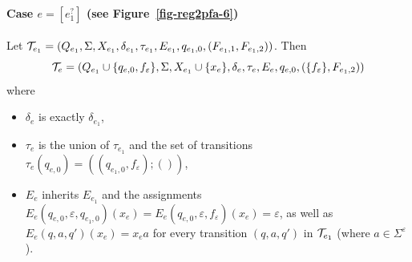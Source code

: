\paragraph{Case $e = [e_1^?]$ (see Figure~\ref{fig-reg2pfa-6})} Let $\mathcal{T}_{e_1} = (Q_{e_1}, \Sigma, X_{e_1}, \delta_{e_1}, \tau_{e_1}, E_{e_1}, q_{e_1,0}, (F_{e_1,1}, F_{e_1,2}))$. Then 
\[\mathcal{T}_e = (Q_{e_1} \cup \{q_{e,0}, f_{\varepsilon}\}, \Sigma, X_{e_1} \cup \{x_e\}, 
		\delta_e, \tau_e, E_{e}, q_{e,0}, (\{f_{\varepsilon}\}, F_{e_1,2}))\]
where  
		\begin{itemize}
			\item $\delta_e$ is exactly $\delta_{e_1}$,
			\item $\tau_e$ is the union of $\tau_{e_1}$ and the set of transitions $\tau_e(q_{e,0}) = ((q_{e_1,0}, f_{\varepsilon}); ())$,
			\item $E_e$ inherits $E_{e_1}$ and the assignments $E_e(q_{e,0},\varepsilon,q_{e_1, 0})(x_e) = E_e(q_{e,0},\varepsilon,f_{\varepsilon})(x_e) =\varepsilon$, as well as $E_e(q, a, q')(x_e) =x_e a$ for every transition $(q, a, q')$ in $\mathcal{T}_{e_1}$ (where $a \in \Sigma^\varepsilon$).
		\end{itemize}

